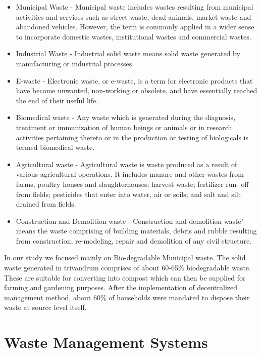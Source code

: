 \documentclass[12pt,a4paper]{report}
\begin{document}
\begin{itemize}
	\item Municipal Waste - Municipal waste includes wastes resulting from municipal activities and services such as street waste, dead animals, market waste and abandoned vehicles. However, the term is commonly applied in a wider sense to incorporate domestic wastes, institutional wastes and commercial wastes.
	
	\item Industrial Waste -  Industrial solid waste means solid waste generated by manufacturing or industrial processes.
	
	\item E-waste - Electronic waste, or e-waste, is a term for electronic products that have become unwanted, non-working or obsolete, and have essentially reached the end of their useful life.
	
	\item Biomedical waste - Any waste which is generated during the diagnosis, treatment or immunization of human beings or animals or in research activities pertaining thereto or in the production or testing of biologicals is termed biomedical waste.
	
	\item Agricultural waste - Agricultural waste is waste produced as a result of various agricultural operations. It includes manure and other wastes from farms, poultry houses and slaughterhouses; harvest waste; fertilizer run- off from fields; pesticides that enter into water, air or soils; and salt and silt drained from fields.
	
	\item Construction and Demolition waste - Construction and demolition waste" means the waste comprising of building materials, debris and rubble resulting from construction, re-modeling, repair and demolition of any civil structure.
	
\end{itemize}

In our study we focused mainly on Bio-degradable Municipal waste. The solid waste generated in trivandrum comprises of about 60-65\% biodegradable waste. These are suitable for converting into compost which can then be supplied for farming and gardening purposes. After the implementation of decentralized management method, about 60\% of households were mandated to dispose their waste at source level itself. 

\chapter{\textbf{Waste Management Systems}}
\end{document}
